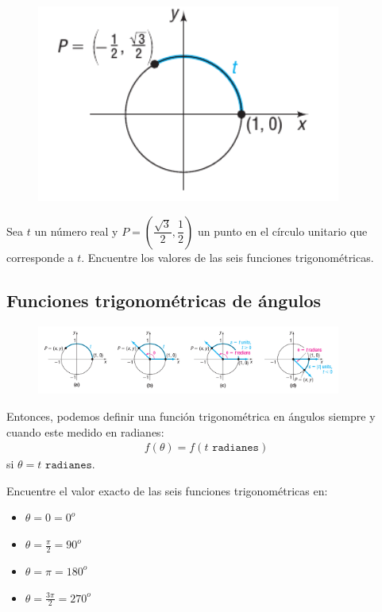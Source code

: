 {}
	\begin{figure}
		\centering
		\includegraphics[width=10cm,keepaspectratio=true]{./trig/sull0619.png}
		\label{fig:0619}
	\end{figure}

{}
	\begin{problema}
		Sea $t$ un número real y $P=\left(\dfrac{\sqrt{3}}{2}, \dfrac{1}{2} \right)$
		un punto en el círculo unitario que corresponde a $t$. Encuentre los valores de las seis funciones trigonométricas.
	\end{problema}
	

\subsection{Funciones trigonométricas de ángulos}
{}
	\begin{figure}
		\centering
		\includegraphics[width=10cm,keepaspectratio=true]{./trig/sull0620.png}
		\label{fig:0620}
	\end{figure}

{}
	Entonces, podemos definir una función trigonométrica en ángulos siempre y cuando este medido en radianes:
	\begin{align*}
		f(\theta)=f(t \texttt{ radianes})
	\end{align*} si $\theta= t \texttt{ radianes}$.

{}
	\begin{problema}
		\label{exmp:sull0602}
		Encuentre el valor exacto de las seis funciones trigonométricas en:
		\begin{itemize}
			\item $\theta=0=0^{o}$
			\item $\theta=\frac{\pi}{2}=90^{o}$ 
			\item $\theta=\pi=180^{o}$ 
			\item $\theta=\frac{3\pi}{2}=270^{o}$
		\end{itemize}
		
	\end{problema}
	

